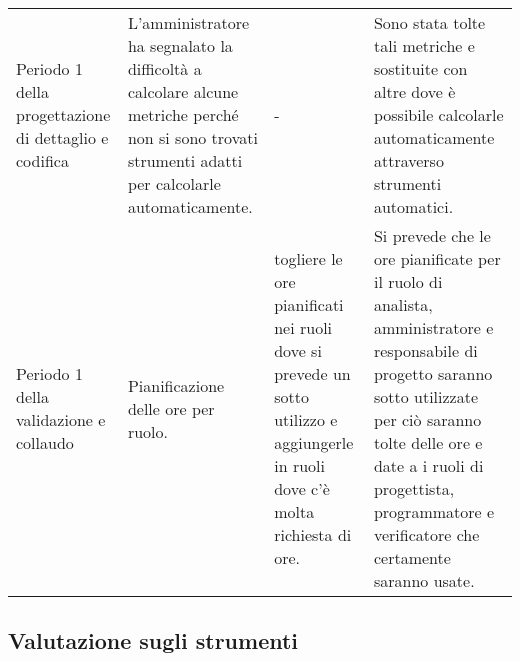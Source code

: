 {\begin{longtable}{ C{3cm} C{4cm} C{3cm} C{4cm}}
		Periodo 1 della progettazione di dettaglio e codifica & L'amministratore ha segnalato la difficoltà a calcolare alcune metriche perché non si sono trovati strumenti adatti per calcolarle automaticamente. & - & Sono stata tolte tali metriche e sostituite con altre dove è possibile calcolarle automaticamente attraverso strumenti automatici. \\
		
		Periodo 1 della validazione e collaudo & Pianificazione delle ore per ruolo. & togliere le ore pianificati nei ruoli dove si prevede un sotto utilizzo e aggiungerle in ruoli dove c'è molta richiesta di ore. & Si prevede che le ore pianificate per il ruolo di analista, amministratore e responsabile di progetto saranno sotto utilizzate per ciò saranno tolte delle ore e date a i ruoli di progettista, programmatore e verificatore che certamente saranno usate.
		
		
	\end{longtable}
}

\subsection{Valutazione sugli strumenti}


